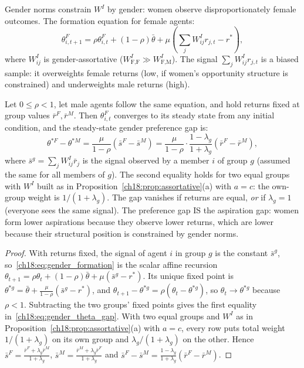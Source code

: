 \documentclass[../structural_economics_book.tex]{subfiles}
\begin{document}
\begin{proposition}\label{ch18:prop:gender_formation}
Gender norms constrain $W^I$ by gender: women observe disproportionately female outcomes. The formation equation for female agents:
\begin{equation}\label{ch18:eq:gender_formation}
\theta^F_{i,t+1} = \rho\theta^F_{i,t} + (1-\rho)\bar{\theta} + \mu\left(\sum_j W^I_{ij}r_{j,t} - r^*\right),
\end{equation}
where $W^I_{ij}$ is gender-assortative ($W^I_{\text{F,F}} \gg W^I_{\text{F,M}}$). The signal $\sum_j W^I_{ij}r_{j,t}$ is a biased sample: it overweights female returns (low, if women's opportunity structure is constrained) and underweights male returns (high).

Let $0 \le \rho < 1$, let male agents follow the same equation, and hold returns fixed at group values $\bar r^F, \bar r^M$. Then $\theta^F_{i,t}$ converges to its steady state from any initial condition, and the steady-state gender preference gap is:
\begin{equation}\label{ch18:eq:gender_theta_gap}
\theta^{*F} - \theta^{*M} = \frac{\mu}{1-\rho}\left(\bar{s}^F - \bar{s}^M\right) = \frac{\mu}{1-\rho}\cdot\frac{1-\lambda_g}{1+\lambda_g}\left(\bar{r}^F - \bar{r}^M\right),
\end{equation}
where $\bar s^g = \sum_j W^I_{ij} \bar r_j$ is the signal observed by a member $i$ of group $g$ (assumed the same for all members of $g$). The second equality holds for two equal groups with $W^I$ built as in Proposition~\ref{ch18:prop:assortative}(a) with $a = c$: the own-group weight is $1/(1+\lambda_g)$. The gap vanishes if returns are equal, \emph{or} if $\lambda_g = 1$ (everyone sees the same signal). The preference gap IS the aspiration gap: women form lower aspirations because they observe lower returns, which are lower because their structural position is constrained by gender norms.
\end{proposition}

\begin{proof}
With returns fixed, the signal of agent $i$ in group $g$ is the constant $\bar s^g$, so~\eqref{ch18:eq:gender_formation} is the scalar affine recursion $\theta_{t+1} = \rho\theta_t + (1-\rho)\bar\theta + \mu(\bar s^g - r^*)$. Its unique fixed point is $\theta^{*g} = \bar\theta + \frac{\mu}{1-\rho}(\bar s^g - r^*)$, and $\theta_{t+1} - \theta^{*g} = \rho(\theta_t - \theta^{*g})$, so $\theta_t \to \theta^{*g}$ because $\rho < 1$. Subtracting the two groups' fixed points gives the first equality in~\eqref{ch18:eq:gender_theta_gap}. With two equal groups and $W^I$ as in Proposition~\ref{ch18:prop:assortative}(a) with $a = c$, every row puts total weight $1/(1+\lambda_g)$ on its own group and $\lambda_g/(1+\lambda_g)$ on the other. Hence $\bar s^F = \frac{\bar r^F + \lambda_g \bar r^M}{1+\lambda_g}$, $\bar s^M = \frac{\bar r^M + \lambda_g \bar r^F}{1+\lambda_g}$ and $\bar s^F - \bar s^M = \frac{1-\lambda_g}{1+\lambda_g}(\bar r^F - \bar r^M)$.
\end{proof}
\end{document}
